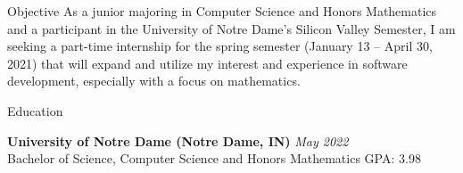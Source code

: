 \documentclass[10pt]{resume} %
\begin{document}
\begin{rSection}{Objective}
 As a junior majoring in Computer Science and Honors Mathematics and a participant in the University of Notre Dame’s Silicon Valley Semester, I am seeking a part-time internship for the spring semester (January 13 – April 30, 2021) that will expand and utilize my interest and experience in software development, especially with a focus on mathematics.
\end{rSection}




\begin{rSection}{Education}

{\bf University of Notre Dame (Notre Dame, IN) } \hfill { \em May 2022 } 
\\Bachelor of Science, Computer Science and Honors Mathematics\hfill { GPA: 3.98 }

\end{rSection}


\end{document}
